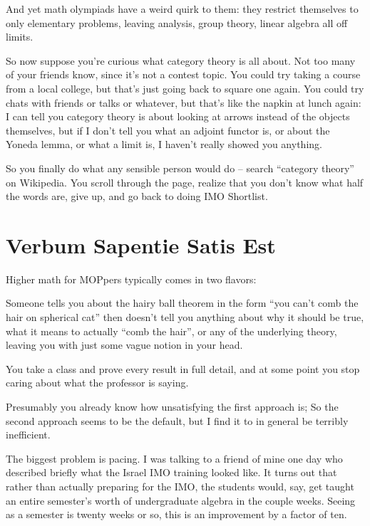 And yet math olympiads have a weird quirk to them: they restrict themselves to only elementary problems, leaving analysis, group theory, linear algebra all off limits.

So now suppose you're curious what category theory is all about.
Not too many of your friends know, since it's not a contest topic.
You could try taking a course from a local college, but that's just going back to square one again.
You could try chats with friends or talks or whatever, but that's like the napkin at lunch again: I can tell you category theory is about looking at arrows instead of the objects themselves, but if I don't tell you what an adjoint functor is, or about the Yoneda lemma, or what a limit is, I haven't really showed you anything.

So you finally do what any sensible person would do -- search ``category theory'' on Wikipedia.
You scroll through the page, realize that you don't know what half the words are, give up, and go back to doing IMO Shortlist.




\section*{Verbum Sapentie Satis Est}
Higher math for MOPpers typically comes in two flavors:
\begin{itemize}
	\ii Someone tells you about the hairy ball theorem in the form ``you can't comb the hair on spherical cat''
	then doesn't tell you anything about why it should be true, what it means to actually ``comb the hair'', 
	or any of the underlying theory, leaving you with just some vague notion in your head.

	\ii You take a class and prove every result in full detail, and at some point
	you stop caring about what the professor is saying.
\end{itemize}
Presumably you already know how unsatisfying the first approach is;
So the second approach seems to be the default, but I find it to in general be terribly inefficient.

The biggest problem is pacing.
I was talking to a friend of mine one day who described briefly
what the Israel IMO training looked like.
It turns out that rather than actually preparing for the IMO,
the students would, say, get taught an entire semester's worth of
undergraduate algebra in the couple weeks.
Seeing as a semester is twenty weeks or so, this is an improvement
by a factor of ten.

